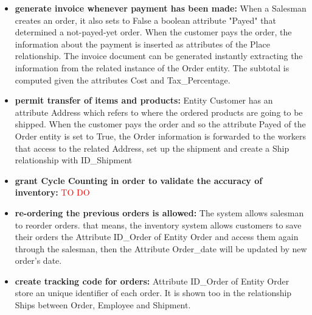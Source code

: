 \begin{itemize}
    \item \textbf{generate invoice whenever payment has been made:} When a Salesman creates an order, it also sets to False a boolean attribute "Payed" that determined a not-payed-yet order. When the customer pays the order, the information about the payment is inserted as attributes of the Place relationship. The invoice document can be generated instantly extracting the information from the related instance of the Order entity. The subtotal is computed given the attributes Cost and Tax\_Percentage.
    \item \textbf{permit transfer of items and products:} Entity Customer has an attribute Address which refers to where the ordered products are going to be shipped. When the customer pays the order and so the attribute Payed of the Order entity is set to True, the Order information is forwarded to the workers that access to the related Address, set up the shipment and create a Ship relationship with ID\_Shipment
    \item \textbf{grant Cycle Counting in order to validate the accuracy of inventory:} \textcolor{Red}{TO DO}
    \item \textbf{re-ordering the previous orders is allowed:} The system allows salesman to reorder orders. that means, the inventory system allows customers to save their orders the Attribute ID\_Order of Entity Order and access them again through the salesman, then the Attribute Order\_date will be updated by new order's date.
    \item \textbf{create tracking code for orders:} Attribute ID\_Order of Entity Order store an unique identifier of each order. It is shown too in the relationship Ships between Order, Employee and Shipment.
\end{itemize}





